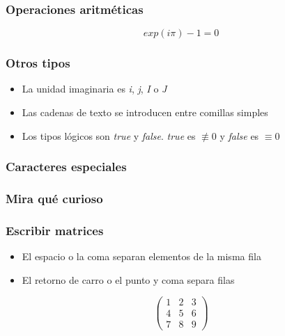 \documentclass[12pt]{beamer}
\begin{document}

\begin{frame}
  \frametitle{Operaciones aritméticas}
  \[ exp(i \pi) - 1 = 0  \]
  \testcode
\end{frame}

\begin{frame}
  \frametitle{Otros tipos}
  \begin{itemize}
  \item La unidad imaginaria es \emph{i}, \emph{j}, \emph{I} o \emph{J}
  \item Las cadenas de texto se introducen entre comillas simples
  \item Los tipos lógicos son \emph{true} y \emph{false}.  \emph{true}
    es $\not \equiv 0$ y \emph{false} es $\equiv 0$
  \end{itemize}
\end{frame}


\begin{frame}
\frametitle{Caracteres especiales}
\testcode
\end{frame}



\begin{frame}
  \frametitle{Mira qué curioso}
  \testcode
\end{frame}

\begin{frame}
\frametitle{Escribir matrices}
\begin{itemize}
  \item El espacio o la coma separan elementos de la misma fila
  \item El retorno de carro o el punto y coma separa filas
\end{itemize}
\[ \left(
\begin{array}{ccc}
1&2&3\\
4&5&6\\
7&8&9
\end{array} \right)
\]
\end{frame}
\end{document}

